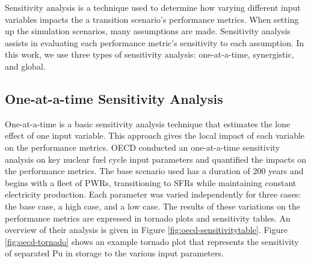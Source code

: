Sensitivity analysis is a technique used to determine how varying
different input variables impacts the a transition scenario's performance metrics.
When setting up the simulation scenarios, many assumptions are made. 
Sensitivity analysis assists in evaluating each performance metric's 
sensitivity to each assumption. 
In this work, we use three types of sensitivity analysis: 
one-at-a-time, synergistic, and global.

\subsection{One-at-a-time Sensitivity Analysis}
One-at-a-time is a basic sensitivity analysis technique that estimates 
the lone effect of one input variable. 
This approach gives the local impact of each variable on the 
performance metrics. 
OECD conducted an one-at-a-time sensitivity analysis \cite{noauthor_effects_2017} 
on key nuclear fuel cycle input parameters
and quantified the impacts on the performance metrics. 
The base scenario used has a duration of 200 years and begins 
with a fleet of \glspl{PWR}, transitioning to \glspl{SFR} while 
maintaining constant electricity production. 
Each parameter was varied independently for three cases: 
the base case, a high case, and a low case. 
The results of these variations on the performance metrics 
are expressed in tornado plots and sensitivity tables. 
An overview of their analysis is given in 
Figure \ref{fig:oecd-sensitivitytable}. 
Figure \ref{fig:oecd-tornado} shows an example tornado plot that represents 
the sensitivity of separated Pu in storage to the various input parameters. 

